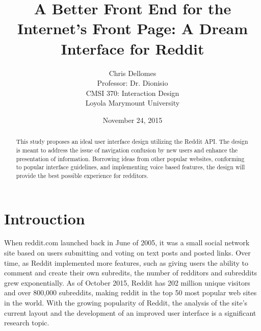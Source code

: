 \documentclass{article}
\begin{document}
\title{A Better Front End for the Internet's Front Page: A Dream Interface for Reddit}
\author{Chris Dellomes\\
Professor: Dr. Dionisio\\
CMSI 370: Interaction Design\\
	Loyola Marymount University}

\date{November 24, 2015}

\maketitle

\begin{center}
\begin{abstract}
\noindent This study proposes an ideal user interface design utilizing the Reddit API. The design is meant to address the issue of navigation confusion by new users and enhance the presentation of information. Borrowing ideas from other popular websites, conforming to popular interface guidelines, and implementing voice based features, the design will provide the best possible experience for redditors.
\end{abstract}
\end{center}

\thispagestyle{empty}

\clearpage

\setcounter{page}{1}

\section{Introuction} When reddit.com launched back in June of 2005\cite{DMR}, it was a small social network site based on users submitting and voting on text posts and posted links. Over time, as Reddit implemented more features, such as giving users the ability to comment and create their own subredits, the number of redditors and subreddits grew exponentially\cite{Metrics}. As of October 2015, Reddit has 202 million unique visitors and over 800,000 subreddits, making reddit in the top 50 most popular web sites in the world\cite{Alexa, Reddit}. With the growing popularity of Reddit, the analysis of the site's current layout and the development of an improved user interface is a significant research topic.
\end{document}
